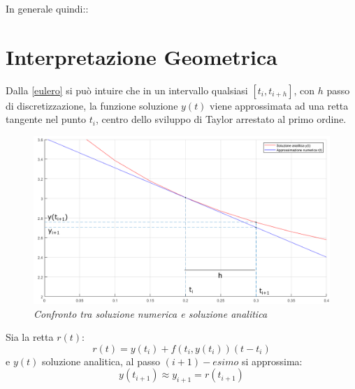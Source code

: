 In generale quindi::
\vspace{0.5cm}
\\
\section{Interpretazione Geometrica}
Dalla \ref{eulero} si può intuire che in un intervallo qualsiasi $[t_i, t_{i+h}]$, con $h$ passo di discretizzazione, la funzione soluzione $y(t)$ viene approssimata ad una retta tangente nel punto $t_i$, centro dello sviluppo di Taylor arrestato al primo ordine. 
\begin{figure}[H]
	\centering
	\includegraphics[width=\textwidth]{matlab/interpretazione_geometrica.png}
	\caption{\textit{Confronto tra soluzione numerica e soluzione analitica}}
\end{figure}
Sia la retta $r(t)$:
\begin{equation*}
	r(t) = y(t_i)+f(t_i,y(t_i))(t-t_i)
\end{equation*}
e $y(t)$ soluzione analitica, al passo $(i+1)-esimo$ si approssima:
\begin{equation*}
	y(t_{i+1}) \approx y_{i+1} = r(t_{i+1})
\end{equation*}

